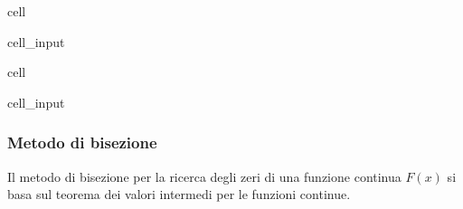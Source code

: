 \documentclass[letterpaper,10pt,english]{jupyterBook}
\begin{document}
\begin{sphinxuseclass}{cell}\begin{sphinxVerbatimInput}

\begin{sphinxuseclass}{cell_input}
\begin{sphinxVerbatim}[commandchars=\\\{\}]

   
   
\end{sphinxVerbatim}

\end{sphinxuseclass}\end{sphinxVerbatimInput}

\end{sphinxuseclass}
\begin{sphinxuseclass}{cell}\begin{sphinxVerbatimInput}

\begin{sphinxuseclass}{cell_input}
\begin{sphinxVerbatim}[commandchars=\\\{\}]

       
      
\end{sphinxVerbatim}

\end{sphinxuseclass}\end{sphinxVerbatimInput}

\end{sphinxuseclass}

\subsubsection{Metodo di bisezione}
\label{\detokenize{ch/numerics/nonlinear:metodo-di-bisezione}}
\sphinxAtStartPar
Il metodo di bisezione per la ricerca degli zeri di una funzione continua \(F(x)\) si basa sul teorema dei valori intermedi per le funzioni continue.
\end{document}

